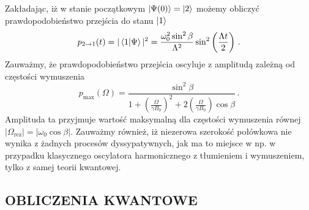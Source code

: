 \documentclass{myclass}
\begin{document}
Zakładając, iż w stanie początkowym \(\ket{\Psi(0)} = \ket{2}\) możemy obliczyć prawdopodobieństwo
przejścia do stanu \(\ket{1}\)
\begin{equation*}
    p_{2\to1}(t) = |\braket{1}{\Psi}|^2 = \frac{\omega_0^2\sin^2\beta}{\Lambda^2}\sin^2\left(\frac{\Lambda t}{2}\right)\,.
\end{equation*}
Zauważmy, że prawdopodobieństwo przejścia oscyluje z amplitudą zależną od częstości wymuszenia
\begin{equation*}
    p_\text{max}(\Omega) = \frac{\sin^2\beta}{1 + \left(\frac{\Omega}{\gamma B_0}\right)^2 + 2\left(\frac{\Omega}{\gamma B_0}\right) \cos\beta} \,.
\end{equation*}
Amplituda ta przyjmuje wartość maksymalną dla częstości wymuszenia równej \(|\Omega_\text{rez}| =
|\omega_0 \cos\beta|\). Zauważmy również, iż niezerowa szerokość połówkowa nie wynika z żadnych
procesów dyssypatywnych, jak ma to miejsce w np. w przypadku klasycznego oscylatora harmonicznego z
tłumieniem i wymuszeniem, tylko z samej teorii kwantowej.

\newpage
\subsection{OBLICZENIA KWANTOWE}




%
\end{document}

